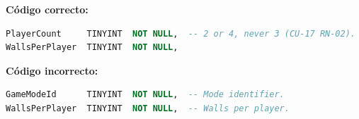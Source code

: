 \textbf{Código correcto:}
\begin{lstlisting}[language=SQL,basicstyle=\ttfamily\small,frame=single,breaklines=true,columns=fullflexible]
PlayerCount     TINYINT  NOT NULL,  -- 2 or 4, never 3 (CU-17 RN-02).
WallsPerPlayer  TINYINT  NOT NULL,
\end{lstlisting}

\textbf{Código incorrecto:}
\begin{lstlisting}[language=SQL,basicstyle=\ttfamily\small,frame=single,breaklines=true,columns=fullflexible]
GameModeId      TINYINT  NOT NULL,  -- Mode identifier.
WallsPerPlayer  TINYINT  NOT NULL,  -- Walls per player.
\end{lstlisting}

